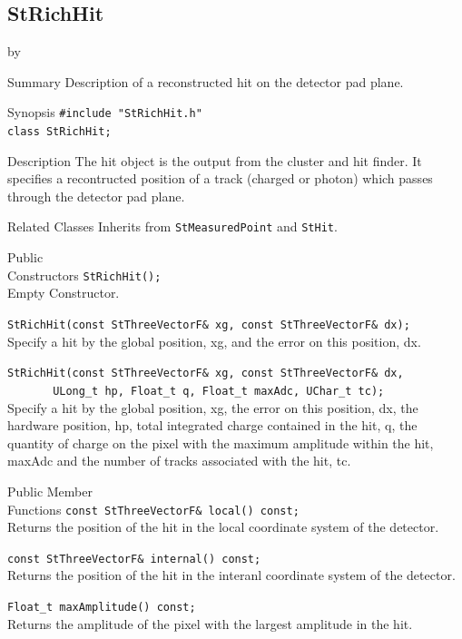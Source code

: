 \documentclass[twoside]{article}
\newcommand{\entrylabel}[1]{\mbox{\textbf{{#1}}}\hfil}%
\newenvironment{entry}
{\begin{list}{}%
    {\renewcommand{\makelabel}{\entrylabel}%
     \setlength{\labelwidth}{90pt}%
     \setlength{\leftmargin}{\labelwidth}
     \advance\leftmargin by \labelsep%
      }%
    }%
  {\end{list}}
\newcommand{\Entrylabel}[1]%
{\raisebox{0pt}[1ex][0pt]{\makebox[\labelwidth][l]%
    {\parbox[t]{\labelwidth}{\hspace{0pt}\textbf{{#1}}}}}}
\newenvironment{Entry}%
{\renewcommand{\entrylabel}{\Entrylabel}\begin{entry}}%
  {\end{entry}}
\begin{document}
\subsection{StRichHit}
\label{sec:StRichHit}
\begin{Entry}
\item[Summary] Description of a reconstructed hit on the detector
    pad plane.
\item[Synopsis]
    \verb+#include "StRichHit.h"+\\
    \verb+class StRichHit;+\\
\item[Description] The hit object is the output from the
    cluster and hit finder.  It specifies a recontructed position
    of a track (charged or photon) which passes through the
    detector pad plane.
\item[Related Classes]
    Inherits from \texttt{StMeasuredPoint} and \texttt{StHit}.
\item[Public\\ Constructors]
    \verb+StRichHit();+\\
    Empty Constructor.
    
    \verb+StRichHit(const StThreeVectorF& xg, const StThreeVectorF& dx);+\\
    Specify a hit by the global position, xg, and the error on this
    position, dx.

    \verb+StRichHit(const StThreeVectorF& xg, const StThreeVectorF& dx,+\\
    \verb+       ULong_t hp, Float_t q, Float_t maxAdc, UChar_t tc);+\\
    Specify a hit by the global position, xg, the error on this
    position, dx, the hardware position, hp, total integrated charge
    contained in the hit, q, the quantity of charge on the pixel with
    the maximum amplitude within the hit, maxAdc and the number of
    tracks associated with the hit, tc.
\item[Public Member\\ Functions]
    \verb+const StThreeVectorF& local() const;+\\
    Returns the position of the hit in the local coordinate
    system of the detector.

    \verb+const StThreeVectorF& internal() const;+\\
    Returns the position of the hit in the interanl coordinate
    system of the detector.

    \verb+Float_t maxAmplitude() const;+\\
    Returns the amplitude of the pixel with the largest
    amplitude in the hit.


\end{Entry}
\end{document}
